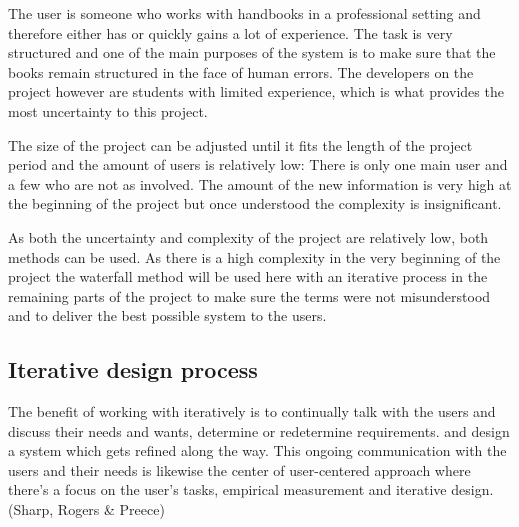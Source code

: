 The user is someone who works with handbooks in a professional setting and therefore either has or quickly gains a lot of experience. The task is very structured and one of the main purposes of the system is to make sure that the books remain structured in the face of human errors. The developers on the project however are students with limited experience, which is what provides the most uncertainty to this project. %

The size of the project can be adjusted until it fits the length of the project period and the amount of users is relatively low: There is only one main user and a few who are not as involved. The amount of the new information is very high at the beginning of the project but once understood the complexity is insignificant.

As both the uncertainty and complexity of the project are relatively low, both methods can be used. As there is a high complexity in the very beginning of the project the waterfall method will be used here with an iterative process in the remaining parts of the project to make sure the terms were not misunderstood and to deliver the best possible system to the users. %



\subsection{Iterative design process}
The benefit of working with iteratively is to continually talk with the users and discuss their needs and wants, determine or redetermine requirements. and design a system which gets refined along the way. This ongoing communication with the users and their needs is likewise the center of user-centered approach where there’s a focus on the user’s tasks, empirical measurement and iterative design. (Sharp, Rogers \& Preece)

